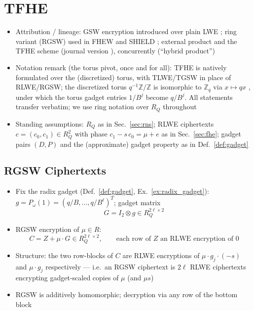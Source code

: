 \newpage

\section{TFHE}

\begin{itemize}
    \item Attribution / lineage: GSW encryption introduced over plain LWE
          \cite{GSW13}; ring variant (RGSW) used in FHEW \cite{DM15} and
          SHIELD \cite{KGS16}; external product and the TFHE scheme
          \cite{CGGI16} (journal version \cite{CGGI20}), concurrently
          \cite{BP16} (``hybrid product'')
    \item Notation remark (the torus pivot, once and for all): TFHE is natively
          formulated over the (discretized) torus, with TLWE/TGSW in place of
          RLWE/RGSW; the discretized torus $q^{-1}\mathbb{Z}/\mathbb{Z}$ is
          isomorphic to $\mathbb{Z}_q$ via $x \mapsto qx$ \cite{Joye22}, under
          which the torus gadget entries $1/B^j$ become $q/B^j$. All statements
          transfer verbatim; we use ring notation over $R_Q$ throughout
    \item Standing assumptions: $R_Q$ as in Sec.~\ref{sec:rns}; RLWE ciphertexts
          $c = (c_0, c_1) \in R_Q^2$ with phase $c_1 - s\,c_0 = \mu + e$ as in
          Sec.~\ref{sec:fhe}; gadget pairs $(D, P)$ and the (approximate) gadget
          property as in Def.~\ref{def:gadget}
\end{itemize}

\subsection{RGSW Ciphertexts}
\begin{itemize}
    \item Fix the radix gadget (Def.~\ref{def:gadget}, Ex.~\ref{ex:radix_gadget}):
          $g = P_\omega(1) = (q/B, \dots, q/B^\ell)^T$; gadget matrix
          \begin{equation}
              G = I_2 \otimes g \in R_Q^{2\ell \times 2}
          \end{equation}
    \item RGSW encryption of $\mu \in R$:
          \begin{equation}
              \label{eq:rgsw}
              C = Z + \mu\cdot G \in R_Q^{2\ell \times 2},
              \qquad \text{each row of } Z \text{ an RLWE encryption of } 0
          \end{equation}
    \item Structure: the two row-blocks of $C$ are RLWE encryptions of
          $\mu \cdot g_j \cdot (-s)$ and $\mu \cdot g_j$ respectively ---
          i.e.\ an RGSW ciphertext is $2\ell$ RLWE ciphertexts encrypting
          gadget-scaled copies of $\mu$ (and $\mu s$)
    \item RGSW is additively homomorphic; decryption via any row of the
          bottom block
\end{itemize}

